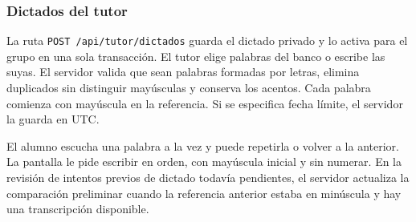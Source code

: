 \subsubsection{Dictados del tutor}

La ruta \texttt{POST /api/tutor/dictados} guarda el dictado privado y lo activa para el grupo en una sola transacción. El tutor elige palabras del banco o escribe las suyas. El servidor valida que sean palabras formadas por letras, elimina duplicados sin distinguir mayúsculas y conserva los acentos. Cada palabra comienza con mayúscula en la referencia. Si se especifica fecha límite, el servidor la guarda en UTC.

El alumno escucha una palabra a la vez y puede repetirla o volver a la anterior. La pantalla le pide escribir en orden, con mayúscula inicial y sin numerar. En la revisión de intentos previos de dictado todavía pendientes, el servidor actualiza la comparación preliminar cuando la referencia anterior estaba en minúscula y hay una transcripción disponible.
